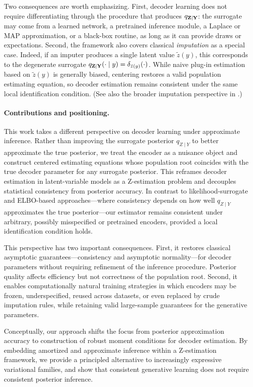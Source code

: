 \documentclass[twoside,11pt]{article}
\begin{document}
Two consequences are worth emphasizing.
First, decoder learning does not require differentiating through the procedure that produces $q_{{\bf Z}\mid{\bf Y}}$: the surrogate may come from a learned network, a pretrained inference module, a Laplace or MAP approximation, or a black-box routine, as long as it can provide draws or expectations.
Second, the framework also covers classical \emph{imputation} as a special case.
Indeed, if an imputer produces a single latent value $\tilde z(y)$, this corresponds to the degenerate surrogate $q_{{\bf Z}\mid{\bf Y}}(\cdot\mid y)=\delta_{\tilde z(y)}(\cdot)$.
While naive plug-in estimation based on $\tilde z(y)$ is generally biased, centering restores a valid population estimating equation, so decoder estimation remains consistent under the same local identification condition.
(See also the broader imputation perspective in \citealp{rubin1987multiple}.)

\paragraph{Contributions and positioning.}
This work takes a different perspective on decoder learning under approximate inference. 
Rather than improving the surrogate posterior $q_{Z\mid Y}$ to better approximate the true posterior, we treat the encoder as a nuisance object and construct centered estimating equations whose population root coincides with the true decoder parameter for any surrogate posterior. 
This reframes decoder estimation in latent-variable models as a Z-estimation problem and decouples statistical consistency from posterior accuracy. 
In contrast to likelihood-surrogate and ELBO-based approaches---where consistency depends on how well $q_{Z\mid Y}$ approximates the true posterior---our estimator remains consistent under arbitrary, possibly misspecified or pretrained encoders, provided a local identification condition holds.

This perspective has two important consequences. 
First, it restores classical asymptotic guarantees---consistency and asymptotic normality---for decoder parameters without requiring refinement of the inference procedure. 
Posterior quality affects efficiency but not correctness of the population root. 
Second, it enables computationally natural training strategies in which encoders may be frozen, underspecified, reused across datasets, or even replaced by crude imputation rules, while retaining valid large-sample guarantees for the generative parameters.

Conceptually, our approach shifts the focus from posterior approximation accuracy to construction of robust moment conditions for decoder estimation. 
By embedding amortized and approximate inference within a Z-estimation framework, we provide a principled alternative to increasingly expressive variational families, and show that consistent generative learning does not require consistent posterior inference.
\end{document}
